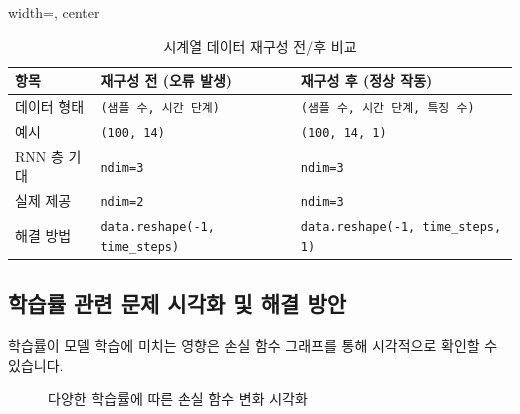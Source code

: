 \documentclass[11pt,a4paper]{book}
\theoremstyle{definition}
\begin{document}
\begin{table}[h!]
\centering
\caption{시계열 데이터 재구성 전/후 비교}
\label{tab:reshape_comparison}
\begin{adjustbox}{width=\textwidth, center}
\begin{tabular}{lll}
\toprule
\textbf{항목} & \textbf{재구성 전 (오류 발생)} & \textbf{재구성 후 (정상 작동)} \\
\midrule
데이터 형태 & \texttt{(샘플 수, 시간 단계)} & \texttt{(샘플 수, 시간 단계, 특징 수)} \\
예시 & \texttt{(100, 14)} & \texttt{(100, 14, 1)} \\
RNN 층 기대 & \texttt{ndim=3} & \texttt{ndim=3} \\
실제 제공 & \texttt{ndim=2} & \texttt{ndim=3} \\
해결 방법 & \texttt{data.reshape(-1, time\_steps)} & \texttt{data.reshape(-1, time\_steps, 1)} \\
\bottomrule
\end{tabular}
\end{adjustbox}
\end{table}

\subsection{학습률 관련 문제 시각화 및 해결 방안}
학습률이 모델 학습에 미치는 영향은 손실 함수 그래프를 통해 시각적으로 확인할 수 있습니다.

\begin{figure}[h!]
\centering
\caption{다양한 학습률에 따른 손실 함수 변화 시각화}
\label{fig:lr_visualization}
\end{figure}
\end{document}
